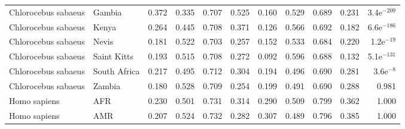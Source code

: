 \begin{longtable}{llrrrrrrrrr}
 Chlorocebus sabaeus &                    Gambia &                              0.372 &                               0.335 &                 0.707 &                 0.525 &                              0.160 &                               0.529 &                 0.689 &                 0.231 & 3.4e$^{-209}$ \\
 Chlorocebus sabaeus &                     Kenya &                              0.264 &                               0.445 &                 0.708 &                 0.371 &                              0.126 &                               0.566 &                 0.692 &                 0.182 & 6.6e$^{-186}$ \\
 Chlorocebus sabaeus &                     Nevis &                              0.181 &                               0.522 &                 0.703 &                 0.257 &                              0.152 &                               0.533 &                 0.684 &                 0.220 &  1.2e$^{-19}$ \\
 Chlorocebus sabaeus &               Saint Kitts &                              0.193 &                               0.515 &                 0.708 &                 0.272 &                              0.092 &                               0.596 &                 0.688 &                 0.132 & 5.1e$^{-131}$ \\
 Chlorocebus sabaeus &              South Africa &                              0.217 &                               0.495 &                 0.712 &                 0.304 &                              0.194 &                               0.496 &                 0.690 &                 0.281 &   3.6e$^{-8}$ \\
 Chlorocebus sabaeus &                    Zambia &                              0.180 &                               0.528 &                 0.709 &                 0.254 &                              0.199 &                               0.491 &                 0.690 &                 0.288 &         0.981 \\
        Homo sapiens &                       AFR &                              0.230 &                               0.501 &                 0.731 &                 0.314 &                              0.290 &                               0.509 &                 0.799 &                 0.362 &         1.000 \\
        Homo sapiens &                       AMR &                              0.207 &                               0.524 &                 0.732 &                 0.282 &                              0.307 &                               0.489 &                 0.796 &                 0.385 &         1.000 \\

\end{longtable}
